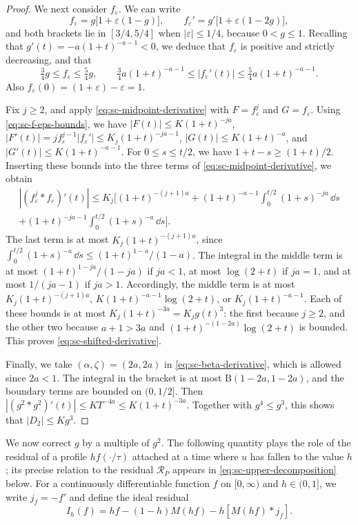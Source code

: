 \begin{proof}
We next consider $f_\varepsilon$. We can write
\[
 f_\varepsilon=g\bigl[1+\varepsilon(1-g)\bigr],\qquad
 f_\varepsilon'=g'\bigl[1+\varepsilon(1-2g)\bigr],
\]
and both brackets lie in $[3/4,5/4]$ when $|\varepsilon|\le1/4$, because $0<g\le1$. Recalling that $g'(t)=-a(1+t)^{-a-1}<0$, we deduce that $f_\varepsilon$ is positive and strictly decreasing, and that
\begin{equation}\label{eq:sc-f-eps-bounds}
 \tfrac34 g\le f_\varepsilon\le\tfrac54 g,\qquad
 \tfrac34a(1+t)^{-a-1}\le|f_\varepsilon'(t)|\le\tfrac54a(1+t)^{-a-1}.
\end{equation}
Also $f_\varepsilon(0)=(1+\varepsilon)-\varepsilon=1$.

Fix $j\ge2$, and apply \eqref{eq:sc-midpoint-derivative} with $F=f_\varepsilon^j$ and $G=f_\varepsilon$. Using \eqref{eq:sc-f-eps-bounds}, we have $|F(t)|\le K(1+t)^{-ja}$, $|F'(t)|=jf_\varepsilon^{j-1}|f_\varepsilon'|\le K_j(1+t)^{-ja-1}$, $|G(t)|\le K(1+t)^{-a}$, and $|G'(t)|\le K(1+t)^{-a-1}$. For $0\le s\le t/2$, we have $1+t-s\ge(1+t)/2$. Inserting these bounds into the three terms of \eqref{eq:sc-midpoint-derivative}, we obtain
\begin{multline*}
 |(f_\varepsilon^j*f_\varepsilon)'(t)|\le K_j\bigg[(1+t)^{-(j+1)a}
 +(1+t)^{-a-1}\int_0^{t/2}(1+s)^{-ja}\,\dd s\\
 +(1+t)^{-ja-1}\int_0^{t/2}(1+s)^{-a}\,\dd s\bigg].
\end{multline*}
The last term is at most $K_j(1+t)^{-(j+1)a}$, since $\int_0^{t/2}(1+s)^{-a}\,\dd s\le(1+t)^{1-a}/(1-a)$. The integral in the middle term is at most $(1+t)^{1-ja}/(1-ja)$ if $ja<1$, at most $\log(2+t)$ if $ja=1$, and at most $1/(ja-1)$ if $ja>1$. Accordingly, the middle term is at most $K_j(1+t)^{-(j+1)a}$, $K(1+t)^{-a-1}\log(2+t)$, or $K_j(1+t)^{-a-1}$. Each of these bounds is at most $K_j(1+t)^{-3a}=K_jg(t)^3$: the first because $j\ge2$, and the other two because $a+1>3a$ and $(1+t)^{-(1-2a)}\log(2+t)$ is bounded. This proves \eqref{eq:sc-shifted-derivative}.

Finally, we take $(\alpha,\zeta)=(2a,2a)$ in \eqref{eq:sc-beta-derivative}, which is allowed since $2a<1$. The integral in the bracket is at most $\mathrm B(1-2a,1-2a)$, and the boundary terms are bounded on $(0,1/2]$. Then $|(g^2*g^2)'(t)|\le KT^{-4a}\le K(1+t)^{-3a}$. Together with $g^4\le g^3$, this shows that $|D_2|\le Kg^3$.
\end{proof}

We now correct $g$ by a multiple of $g^2$. The following quantity plays the role of the residual of a profile $hf(\cdot/\tau)$ attached at a time where $u$ has fallen to the value $h$; its precise relation to the residual $\mathcal R_P$ appears in \eqref{eq:sc-upper-decomposition} below. For a continuously differentiable function $f$ on $[0,\infty)$ and $h\in(0,1]$, we write $j_f=-f'$ and define the ideal residual
\begin{equation}
 I_h(f)=hf-(1-h)M(hf)-h[M(hf)*j_f].
 \label{eq:sc-ideal-residual}
\end{equation}

